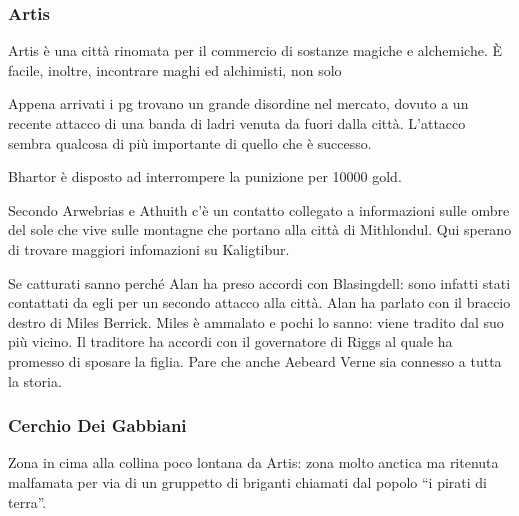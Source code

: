 \subsubsection{Artis}
Artis \`e una citt\`a rinomata per il commercio di sostanze magiche e
alchemiche. \`E facile, inoltre, incontrare maghi ed alchimisti, non solo
\begin{quotebox}
  Appena arrivati i pg trovano un grande disordine nel mercato, dovuto a un recente attacco di
  una banda di ladri venuta da fuori dalla citt\`a. L'attacco sembra qualcosa di pi\`u
  importante di quello che \`e successo.
\end{quotebox}
\begin{quotebox}
  Bhartor \`e disposto ad interrompere la punizione per 10000 gold.
\end{quotebox}
\begin{quotebox}
  Secondo Arwebrias e Athuith c'\`e un contatto collegato a informazioni sulle
  ombre del sole che vive sulle montagne che portano alla citt\`a di Mithlondul.
  Qui sperano di trovare maggiori infomazioni su Kaligtibur.
\end{quotebox}
\begin{quotebox}
  Se catturati sanno perch\'e Alan ha preso accordi con Blasingdell: sono infatti stati
  contattati da egli per un secondo attacco alla citt\`a. Alan ha parlato con il braccio
  destro di Miles Berrick. Miles \`e ammalato e pochi lo sanno: viene tradito dal
  suo pi\`u vicino. Il traditore ha accordi con il governatore di Riggs al quale
  ha promesso di sposare la figlia. Pare che anche Aebeard Verne sia connesso a tutta la
  storia.
\end{quotebox}

\subsubsection{Cerchio Dei Gabbiani}\label{loc:gabbiani}
Zona in cima alla collina poco lontana da Artis: zona molto anctica ma ritenuta
malfamata per via di un gruppetto di briganti chiamati dal popolo ``i pirati
di terra''.
